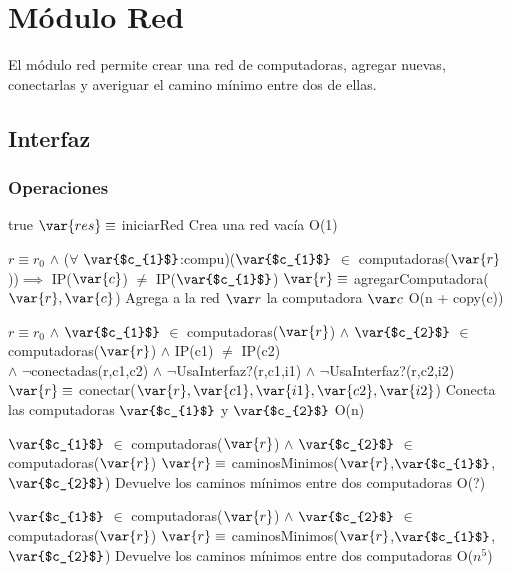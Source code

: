
\section{Módulo Red}

El módulo red permite crear una red de computadoras, agregar nuevas, conectarlas y averiguar el camino mínimo entre dos de ellas.

\subsection{Interfaz}


\subsubsection*{Operaciones}

 {true}
 {$\var{res} \equiv$ iniciarRed}
 {Crea una red vacía}
 {O(1)}

 {$r \equiv r_0$ $\land$ ($\forall$ $\var{$c_{1}$}$:compu)($\var{$c_{1}$}$ $\in$ computadoras($\var{r}$))$\implies$ IP($\var{c}$) $\neq$ IP($\var{$c_{1}$}$)}
 {$\var{r} \equiv$ agregarComputadora($\var{r},\var{c}$)}
 {Agrega a la red $\var r$ la computadora $\var c$}
 {O(n + copy(c))}

 {$r \equiv r_0$ $\land$ $\var{$c_{1}$}$ $\in$ computadoras($\var{r}$) $\land$ $\var{$c_{2}$}$ $\in$ computadoras($\var{r}$) $\land$ IP(c1) $\neq$ IP(c2) \\ $\land$ $\neg$conectadas(r,c1,c2) $\land$ $\neg$UsaInterfaz?(r,c1,i1) $\land$ $\neg$UsaInterfaz?(r,c2,i2)}
 {$\var{r} \equiv$ conectar($\var{r},\var{c1},\var{i1},\var{c2},\var{i2}$)}
 {Conecta las computadoras $\var{$c_{1}$}$ y $\var{$c_{2}$}$}
 {O(n)}

 {$\var{$c_{1}$}$ $\in$ computadoras($\var{r}$) $\land$ $\var{$c_{2}$}$ $\in$ computadoras($\var{r}$)}
 {$\var{r} \equiv$ caminosMinimos($\var{r}$,$\var{$c_{1}$}$,$\var{$c_{2}$}$)}
 {Devuelve los caminos mínimos entre dos computadoras}
 {O(?)}

 {$\var{$c_{1}$}$ $\in$ computadoras($\var{r}$) $\land$ $\var{$c_{2}$}$ $\in$ computadoras($\var{r}$)}
 {$\var{r} \equiv$ caminosMinimos($\var{r}$,$\var{$c_{1}$}$,$\var{$c_{2}$}$)}
 {Devuelve los caminos mínimos entre dos computadoras}
 {O($n^5$)}



